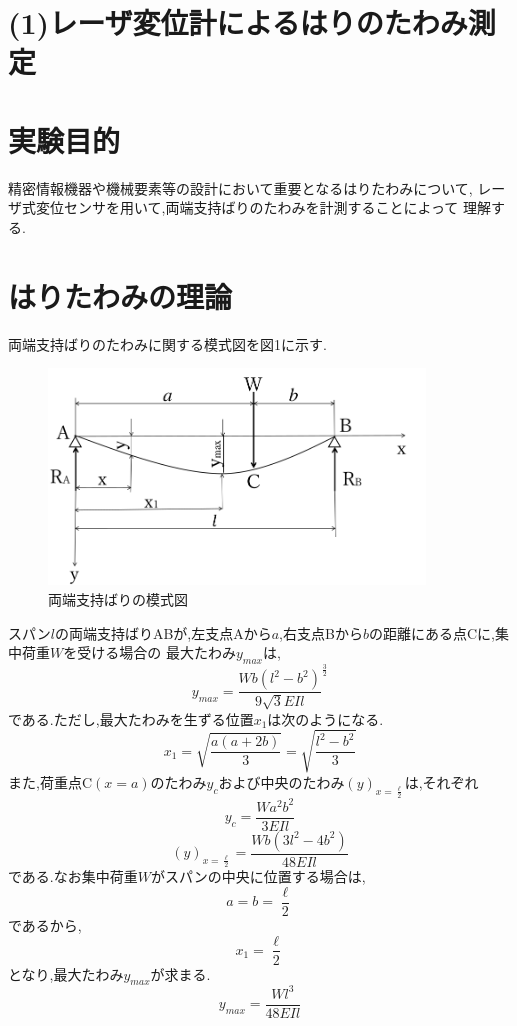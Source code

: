 \documentclass[a4paper,11pt]{jsarticle}
\begin{document}
\section*{(1)レーザ変位計によるはりのたわみ測定}

\section{実験目的}
精密情報機器や機械要素等の設計において重要となるはりたわみについて,
レーザ式変位センサを用いて,両端支持ばりのたわみを計測することによって
理解する.

\section{はりたわみの理論}
両端支持ばりのたわみに関する模式図を図1に示す.

\begin{figure}[h]
  \centering
  \includegraphics[width=10cm]{AB.png}
  \caption{両端支持ばりの模式図}
\end{figure}
スパン$l$の両端支持ばりABが,左支点Aから$a$,右支点Bから$b$の距離にある点Cに,集中荷重$W$を受ける場合の
最大たわみ$y_{max}$は,
\begin{equation}
  y_{max} = {\dfrac{Wb({l^2}-{b^2})}{9\sqrt{3}EIl}}^{\frac{3}{2}}
\end{equation}
である.ただし,最大たわみを生ずる位置$x_1$は次のようになる.
\begin{equation}
  x_1 = {\sqrt{\dfrac{a(a+2b)}{3}}}={\sqrt{\dfrac{{l^2}-{b^2}}{3}}}
\end{equation}
また,荷重点C$(x=a)$のたわみ$y_c$および中央のたわみ$(y)_{x=\frac{\ell}{2}}$は,それぞれ
\begin{equation}
  y_{c} = {\dfrac{Wa^{2}b^{2}}{3EIl}}
\end{equation}
\begin{equation}
  (y)_{x=\frac{\ell}{2}} = {\dfrac{Wb(3l^{2}-4b^{2})}{48EIl}}
\end{equation}
である.なお集中荷重$W$がスパンの中央に位置する場合は,
\begin{equation}
  a = b = \dfrac{\ell}{2}
\end{equation}
であるから,
\begin{equation}
  x_1 = \dfrac{\ell}{2}
\end{equation}
となり,最大たわみ$y_{max}$が求まる.
\begin{equation}
  y_{max} = {\dfrac{Wl^{3}}{48EIl}}
\end{equation}
\end{document}

